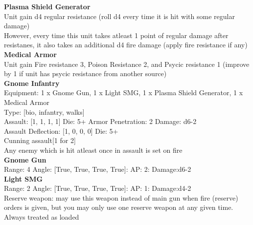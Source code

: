 {\bf Plasma Shield Generator } \\

Unit gain d4 regular resistance (roll d4 every time it is hit with some regular damage)\\ 
However, every time this unit takes atleast 1 point of regular damage after resistanes, it also takes an additional d4 fire damage (apply fire resistance if any)\\ 





{\bf Medical Armor } \\

Unit gain Fire resistance 3, Poison Resistance 2, and Psycic resistance 1 (improve by 1 if unit has psycic resistance from another source)\\ 





 



{\bf Gnome Infantry } \\
Equipment: 1 x Gnome Gun, 1 x Light SMG, 1 x Plasma Shield Generator, 1 x Medical Armor \\
Type: [bio, infantry, walks] \\

Assault: [1, 1, 1, 1] Die: 5+ Armor Penetration: 2 Damage: d6-2 \\
Assault Deflection: [1, 0, 0, 0] Die: 5+\\
\indent Cunning assault[1 for 2]\\ 
Any enemy which is hit atleast once in assault is set on fire\\ 



{\bf Gnome Gun } \\



Range: 4  Angle: [True, True, True, True]: AP: 2: Damage:d6-2 \\




{\bf Light SMG } \\



Range: 2  Angle: [True, True, True, True]: AP: 1: Damage:d4-2 \\
Reserve weapon: may use this weapon instead of main gun when fire (reserve) orders is given, but you may only use one reserve weapon at any given time.\\ 
Always treated as loaded\\ 




